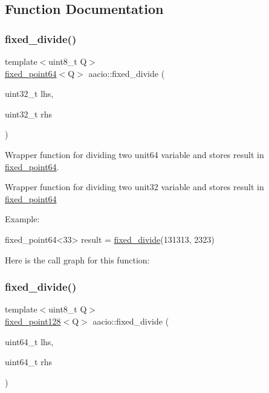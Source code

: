 \subsection{Function Documentation}
\mbox{\label{group__fixedpoint_ga605ac661acc42c361ed85c4398e880d0}} 
\subsubsection{\texorpdfstring{fixed\+\_\+divide()}{fixed\_divide()}\hspace{0.1cm}{\footnotesize\ttfamily [1/2]}}
{\footnotesize\ttfamily template$<$uint8\+\_\+t Q$>$ \\
\mbox{\hyperlink{structaacio_1_1fixed__point64}{fixed\+\_\+point64}}$<$Q$>$ aacio\+::fixed\+\_\+divide (\begin{DoxyParamCaption}\item[{uint32\+\_\+t}]{lhs,  }\item[{uint32\+\_\+t}]{rhs }\end{DoxyParamCaption})}



Wrapper function for dividing two unit64 variable and stores result in \mbox{\hyperlink{structaacio_1_1fixed__point64}{fixed\+\_\+point64}}. 

Wrapper function for dividing two unit32 variable and stores result in \mbox{\hyperlink{structaacio_1_1fixed__point64}{fixed\+\_\+point64}}

Example\+: 
\begin{DoxyCode}
fixed\_point64<33> result = \mbox{\hyperlink{group__fixedpoint_ga605ac661acc42c361ed85c4398e880d0}{fixed\_divide}}(131313, 2323)
\end{DoxyCode}
 Here is the call graph for this function\+:
\mbox{\label{group__fixedpoint_gaa76cfb710309434652c4317c2d319c9e}} 
\subsubsection{\texorpdfstring{fixed\+\_\+divide()}{fixed\_divide()}\hspace{0.1cm}{\footnotesize\ttfamily [2/2]}}
{\footnotesize\ttfamily template$<$uint8\+\_\+t Q$>$ \\
\mbox{\hyperlink{structaacio_1_1fixed__point128}{fixed\+\_\+point128}}$<$Q$>$ aacio\+::fixed\+\_\+divide (\begin{DoxyParamCaption}\item[{uint64\+\_\+t}]{lhs,  }\item[{uint64\+\_\+t}]{rhs }\end{DoxyParamCaption})}



